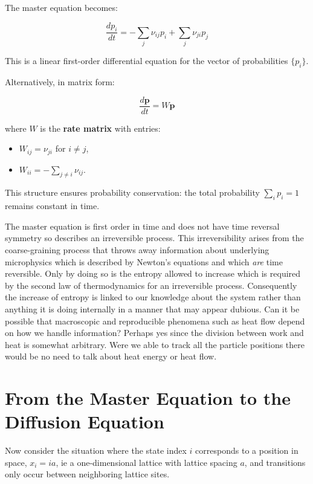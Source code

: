 \documentclass[
  letterpaper,
  enabledeprecatedfontcommands]{report}
\providecommand{\tightlist}{%
  \setlength{\itemsep}{0pt}\setlength{\parskip}{0pt}}
\begin{document}
The master equation becomes:

\[
\frac{dp_i}{dt} = -\sum_j \nu_{ij} p_i + \sum_j \nu_{ji} p_j
\]

This is a linear first-order differential equation for the vector of
probabilities \(\{p_i\}\).

Alternatively, in matrix form:

\[
\frac{d\mathbf{p}}{dt} = W \mathbf{p}
\]

where \(W\) is the \textbf{rate matrix} with entries:

\begin{itemize}
\tightlist
\item
  \(W_{ij} = \nu_{ji}\) for \(i \neq j\),
\item
  \(W_{ii} = -\sum_{j \neq i} \nu_{ij}\).
\end{itemize}

This structure ensures probability conservation: the total probability
\(\sum_i p_i = 1\) remains constant in time.

The master equation is first order in time and does not have time
reversal symmetry so describes an irreversible process. This
irreversibility arises from the coarse-graining process that throws away
information about underlying microphysics which is described by Newton's
equations and which \emph{are} time reversible. Only by doing so is the
entropy allowed to increase which is required by the second law of
thermodynamics for an irreversible process. Consequently the increase of
entropy is linked to our knowledge about the system rather than anything
it is doing internally in a manner that may appear dubious. Can it be
possible that macroscopic and reproducible phenomena such as heat flow
depend on how we handle information? Perhaps yes since the division
between work and heat is somewhat arbitrary. Were we able to track all
the particle positions there would be no need to talk about heat energy
or heat flow.

\section{From the Master Equation to the Diffusion
Equation}\label{from-the-master-equation-to-the-diffusion-equation}

Now consider the situation where the state index \(i\) corresponds to a
position in space, \(x_i = i a\), ie a one-dimensional lattice with
lattice spacing \(a\), and transitions only occur between neighboring
lattice sites.
\end{document}
